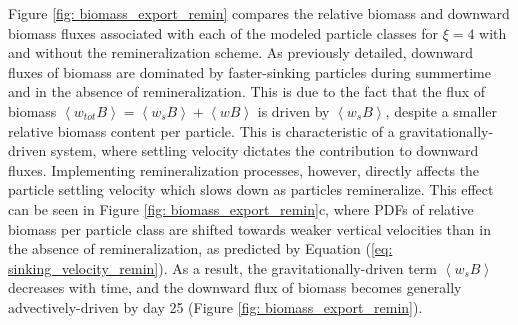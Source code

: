 \documentclass[article,linenumbers]{agujournal2018}
\begin{document}
	Figure \ref{fig: biomass_export_remin} compares the relative biomass and downward biomass fluxes associated with each of the modeled particle classes for $\xi = 4$ with and without the remineralization scheme. As previously detailed, downward fluxes of biomass are dominated by faster-sinking particles during summertime and in the absence of remineralization. This is due to the fact that the flux of biomass $\left<w_{tot}B\right> = \left<w_sB\right> + \left<wB\right>$ is driven by $\left<w_sB\right>$, despite a smaller relative biomass content per particle. This is characteristic of a gravitationally-driven system, where settling velocity dictates the contribution to downward fluxes. Implementing remineralization processes, however, directly affects the particle settling velocity which slows down as particles remineralize. This effect can be seen in Figure \ref{fig: biomass_export_remin}c, where PDFs of relative biomass per particle class are shifted towards weaker vertical velocities than in the absence of remineralization, as predicted by Equation (\ref{eq: sinking_velocity_remin}). As a result, the gravitationally-driven term $\left<w_sB\right>$ decreases with time, and the downward flux of biomass becomes generally advectively-driven by day 25 (Figure \ref{fig: biomass_export_remin}). 
\end{document}
